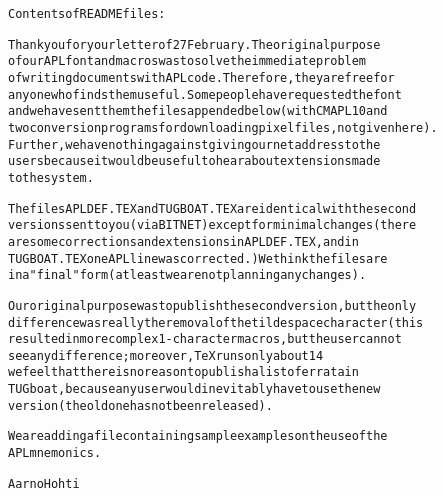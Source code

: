 \par\begin{footnotesize}\begin{alltt}
Contents of README files:\par
Thank you for your letter of 27 February. The original purpose
of our APL font and macros was to solve the immediate problem
of writing documents with APL code. Therefore, they are free for
anyone who finds them useful. Some people have requested the font
and we have sent them the files appended below (with CMAPL10 and
two conversion programs for downloading pixel files, not given here).
Further, we have nothing against giving our net address to the
users because it would be useful to hear about extensions made
to the system.

The files APLDEF.TEX and TUGBOAT.TEX are identical with the second
versions sent to you (via BITNET) except for minimal changes (there
are some corrections and extensions in APLDEF.TEX, and in
TUGBOAT.TEX one APL line was corrected.) We think the files are
in a "final" form (at least we are not planning any changes).

Our original purpose was to publish the second version, but the only
difference was really the removal of the tilde space character (this
resulted in more complex 1-character macros, but the user cannot
see any difference; moreover, TeX runs only about 14% slower). Thus,
we feel that there is no reason to publish a list of errata in
TUGboat, because any user would inevitably have to use the new
version (the old one has not been released).

We are adding a file containing sample examples on the use of the
APL mnemonics.

Aarno Hohti
\end{alltt}\end{footnotesize}\par

